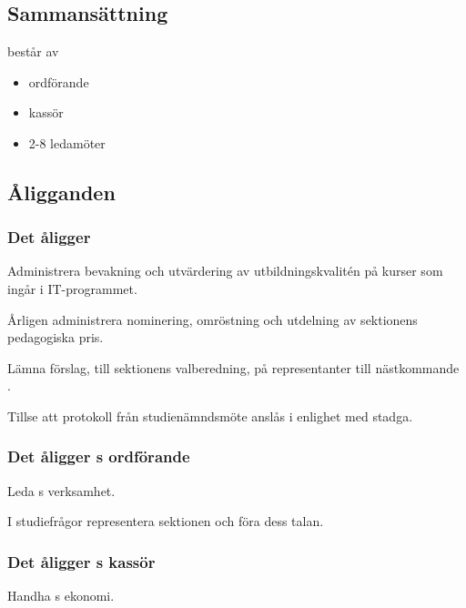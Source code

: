 \section{\SNITFULL}


\subsection{Sammansättning}
\SNIT{} består av
\begin{itemize}
    \item ordförande
    \item kassör
    \item 2-8 ledamöter
\end{itemize}

\subsection{Åligganden}

\subsubsection{Det åligger \SNIT}

\begin{att}
	\item Administrera bevakning och utvärdering av utbildningskvalitén på kurser som ingår i IT-programmet.
	\item Årligen administrera nominering, omröstning och utdelning av sektionens pedagogiska pris.
	\item Lämna förslag, till sektionens valberedning, på representanter till nästkommande \SNIT.
    \item Tillse att protokoll från studienämndsmöte anslås i enlighet med stadga.
\end{att}

\subsubsection{Det åligger \SNIT{}s ordförande}
\begin{att}
	\item Leda \SNIT{}s verksamhet.
	\item I studiefrågor representera sektionen och föra dess talan.
\end{att}

\subsubsection{Det åligger \SNIT{}s kassör}
\begin{att}
	\item Handha \SNIT{}s ekonomi.
\end{att}

